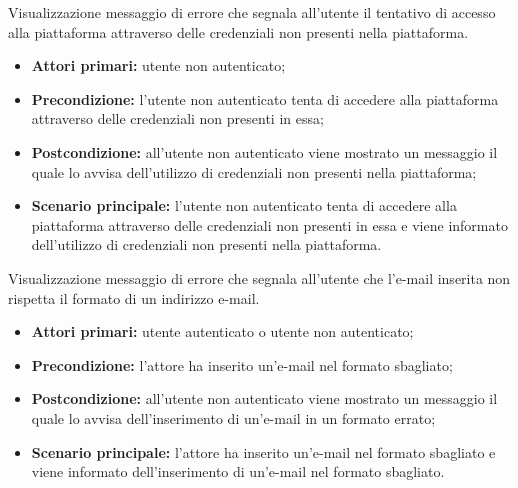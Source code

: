 Visualizzazione messaggio di errore che segnala all'utente il tentativo di accesso alla piattaforma attraverso delle credenziali non presenti nella piattaforma.
\begin{itemize}
    \item \textbf{Attori primari:} utente non autenticato;
    \item \textbf{Precondizione:} l'utente non autenticato tenta di accedere alla piattaforma attraverso delle credenziali non presenti in essa;
    \item \textbf{Postcondizione:} all'utente non autenticato viene mostrato un messaggio il quale lo avvisa dell'utilizzo di credenziali non presenti nella piattaforma;
    \item \textbf{Scenario principale:} l'utente non autenticato tenta di accedere alla piattaforma attraverso delle credenziali non presenti in essa e viene informato dell'utilizzo di credenziali non presenti nella piattaforma.
\end{itemize}


Visualizzazione messaggio di errore che segnala all'utente che l'e-mail inserita non rispetta il formato di un indirizzo e-mail.
\begin{itemize}
    \item \textbf{Attori primari:} utente autenticato o utente non autenticato;
    \item \textbf{Precondizione:} l'attore ha inserito un'e-mail nel formato sbagliato;
    \item \textbf{Postcondizione:} all'utente non autenticato viene mostrato un messaggio il quale lo avvisa dell'inserimento di un'e-mail in un formato errato;
    \item \textbf{Scenario principale:} l'attore ha inserito un'e-mail nel formato sbagliato e viene informato dell'inserimento di un'e-mail nel formato sbagliato.
\end{itemize}


